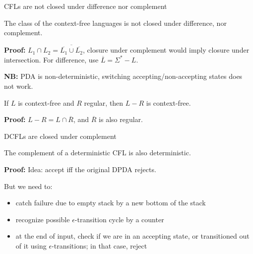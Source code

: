 \documentclass[handout]{beamer}
\begin{document}
\begin{frame}{CFLs are not closed under difference nor complement}

    \begin{theorem}
        The class of the context-free languages is not closed under difference, nor complement.
    \end{theorem}

    \textbf{Proof:} $L_1\cap L_2=\overline{\overline{L_1}\cup\overline{L_2}}$, closure under complement would imply closure under intersection. For difference, use $\overline{L}=\Sigma^*-L$.\hfill\qedsymbol

    \textbf{NB:} PDA is non-deterministic, switching accepting/non-accepting states does not work.

    \medskip

    \begin{proposition}
        If $L$ is context-free and $R$ regular, then $L-R$ is context-free.
    \end{proposition}

    \textbf{Proof:} $L-R=L\cap\overline{R}$, and $\overline{R}$ is also regular.\hfill\qedsymbol 

\end{frame}


\begin{frame}{DCFLs are closed under complement}

    \begin{theorem}
        The complement of a deterministic CFL is also deterministic.
    \end{theorem}
    \textbf{Proof:} Idea: accept iff the original DPDA rejects. 

    But we need to:
    \begin{itemize}
        \item catch failure due to empty stack by a new bottom of the stack
        \item recognize possible $\epsilon$-transition cycle by a counter
        \item at the end of input, check if we are in an accepting state, or transitioned out of it using $\epsilon$-transitions; in that case, reject
    \end{itemize}
    \hfill\qedsymbol

\end{frame}
\end{document}
